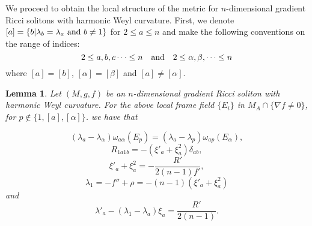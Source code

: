 \documentclass{amsart}
\newtheorem{lemma}[theorem]{Lemma}
\theoremstyle{definition}
\theoremstyle{remark}
\numberwithin{equation}{section}
\begin{document}
	We proceed to obtain the local structure of the metric for $n$-dimensional gradient Ricci solitons with harmonic Weyl curvature.
	First, we denote $[a]=\{b| \lambda_{b}=\lambda_{a}~ {\rm and } ~ b \neq1\}$ for $2\leq a\leq n$
	and make the following conventions on the range of indices:
	\[
	2 \leq a, b, c \cdots\leq n  \quad {\rm and} \quad  2 \leq \alpha, \beta,  \cdots\leq n
	\]
	where $[a]=[b]$, $[\alpha]=[\beta]$ and $[a]\neq[\alpha]$.
		\begin{lemma} \label{lemma3.3-}
		Let $(M, g, f)$ be an $n$-dimensional gradient Ricci soliton  with harmonic Weyl curvature.
		For the above local frame field $\{ E_i \}$ in $M_{A} \cap \{ \nabla f \neq 0 \}$,  for $p \notin \{1,[a],[\alpha]\}$.
		we have that  
		
		\begin{equation}\label{new}
			\left(\lambda_a-\lambda_\alpha \right)\omega_{a\alpha}(E_{p})=	\left(\lambda_a-\lambda_p \right)\omega_{ap}(E_{\alpha}),
		\end{equation}
		\begin{equation}\label{3.8}
			R_{1a1b}=-\left( \xi'_a+\xi^2_a\right) \delta_{ab},
		\end{equation}
		\begin{equation}\label{3.11}
			\xi'_a+\xi^2_a=-\frac{R'}{2(n-1)f'},
		\end{equation}
		\begin{equation}\label{3.13}
			\lambda_{1}=-f''+\rho=-(n-1)\left( \xi'_a+\xi^2_a\right)
		\end{equation}
		and
		\begin{equation}\label{3.12}
			\lambda'_a-\left(\lambda_1-\lambda_a \right)\xi_a=\frac{R'}{2(n-1)}.
		\end{equation}
		
	\end{lemma}
	
\end{document}
